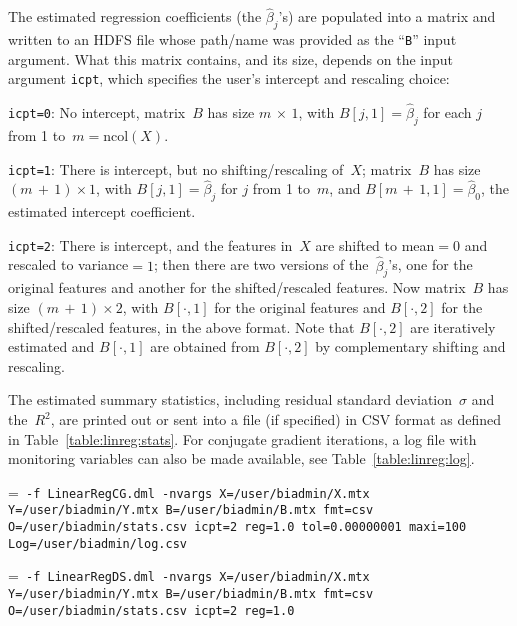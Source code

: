 The estimated regression coefficients (the $\hat{\beta}_j$'s) are populated into
a matrix and written to an HDFS file whose path/name was provided as the ``{\tt B}''
input argument.  What this matrix contains, and its size, depends on the input
argument {\tt icpt}, which specifies the user's intercept and rescaling choice:
\begin{Description}
\item[{\tt icpt=0}:] No intercept, matrix~$B$ has size $m\,{\times}\,1$, with
$B[j, 1] = \hat{\beta}_j$ for each $j$ from 1 to~$m = {}$ncol$(X)$.
\item[{\tt icpt=1}:] There is intercept, but no shifting/rescaling of~$X$; matrix~$B$
has size $(m\,{+}\,1) \times 1$, with $B[j, 1] = \hat{\beta}_j$ for $j$ from 1 to~$m$,
and $B[m\,{+}\,1, 1] = \hat{\beta}_0$, the estimated intercept coefficient.
\item[{\tt icpt=2}:] There is intercept, and the features in~$X$ are shifted to
mean${} = 0$ and rescaled to variance${} = 1$; then there are two versions of
the~$\hat{\beta}_j$'s, one for the original features and another for the
shifted/rescaled features.  Now matrix~$B$ has size $(m\,{+}\,1) \times 2$, with
$B[\cdot, 1]$ for the original features and $B[\cdot, 2]$ for the shifted/rescaled
features, in the above format.  Note that $B[\cdot, 2]$ are iteratively estimated
and $B[\cdot, 1]$ are obtained from $B[\cdot, 2]$ by complementary shifting and
rescaling.
\end{Description}
The estimated summary statistics, including residual standard deviation~$\sigma$ and
the~$R^2$, are printed out or sent into a file (if specified) in CSV format as
defined in Table~\ref{table:linreg:stats}.  For conjugate gradient iterations,
a log file with monitoring variables can also be made available, see
Table~\ref{table:linreg:log}.

\smallskip
{}
\smallskip

{\hangindent=\parindent\noindent\tt
\hml -f LinearRegCG.dml -nvargs X=/user/biadmin/X.mtx Y=/user/biadmin/Y.mtx
  B=/user/biadmin/B.mtx fmt=csv O=/user/biadmin/stats.csv
  icpt=2 reg=1.0 tol=0.00000001 maxi=100 Log=/user/biadmin/log.csv

}
{\hangindent=\parindent\noindent\tt
\hml -f LinearRegDS.dml -nvargs X=/user/biadmin/X.mtx Y=/user/biadmin/Y.mtx
  B=/user/biadmin/B.mtx fmt=csv O=/user/biadmin/stats.csv
  icpt=2 reg=1.0

}

% 
